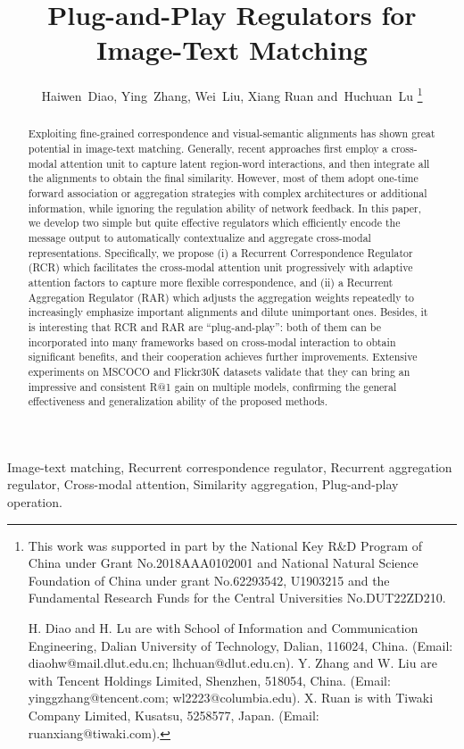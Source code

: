\documentclass[journal]{IEEEtran}\newcommand{\ignore}[1]{}
\begin{document}
\title{Plug-and-Play Regulators for Image-Text Matching}
\author{Haiwen~Diao,
        Ying~Zhang,
        Wei~Liu,
        Xiang Ruan
        and~Huchuan~Lu 
\thanks{
This work was supported in part by the National Key R\&D Program of China under Grant No.2018AAA0102001 and National Natural Science Foundation of China under grant No.62293542, U1903215 and the Fundamental Research Funds for the Central Universities No.DUT22ZD210.

H. Diao and H. Lu are with School of Information and Communication Engineering, Dalian University of Technology, Dalian, 116024, China.  (Email: diaohw@mail.dlut.edu.cn; lhchuan@dlut.edu.cn).
Y. Zhang and W. Liu are with Tencent Holdings Limited, Shenzhen, 518054, China.
(Email: yinggzhang@tencent.com; wl2223@columbia.edu).
X. Ruan is with Tiwaki Company Limited, Kusatsu, 5258577, Japan.
(Email: ruanxiang@tiwaki.com).
}}
\maketitle
{}

\begin{abstract}
Exploiting fine-grained correspondence and visual-semantic alignments has shown great potential in image-text matching. Generally, recent approaches first employ a cross-modal attention unit to capture latent region-word interactions, and then integrate all the alignments to obtain the final similarity. However, most of them adopt one-time forward association or aggregation strategies with complex architectures or additional information, while ignoring the regulation ability of network feedback. In this paper, we develop two simple but quite effective regulators which efficiently encode the message output to automatically contextualize and aggregate cross-modal representations. Specifically, we propose (i) a Recurrent Correspondence Regulator (RCR) which facilitates the cross-modal attention unit progressively with adaptive attention factors to capture more flexible correspondence, and (ii) a Recurrent Aggregation Regulator (RAR) which adjusts the aggregation weights repeatedly to increasingly emphasize important alignments and dilute unimportant ones. Besides, it is interesting that RCR and RAR are “plug-and-play”: both of them can be incorporated into many frameworks based on cross-modal interaction to obtain significant benefits, and their cooperation achieves further improvements. Extensive experiments on MSCOCO and Flickr30K datasets validate that they can bring an impressive and consistent R@1 gain on multiple models, confirming the general effectiveness and generalization ability of the proposed methods.
\end{abstract}
\begin{IEEEkeywords}
Image-text matching, Recurrent correspondence regulator, Recurrent aggregation regulator, Cross-modal attention, Similarity aggregation, Plug-and-play operation.
\end{IEEEkeywords}
\IEEEpeerreviewmaketitle
\end{document}
